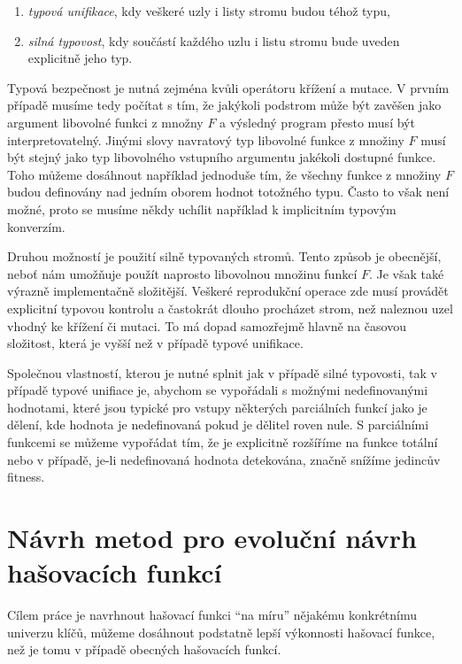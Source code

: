 \begin{enumerate}
	\item \textit{typová unifikace}, kdy veškeré uzly i listy stromu budou téhož typu,
	\item \textit{silná typovost}, kdy součástí každého uzlu i listu stromu bude uveden
	explicitně jeho typ.
\end{enumerate}

Typová bezpečnost je nutná zejména kvůli operátoru křížení a mutace. V prvním případě
musíme tedy počítat s tím, že jakýkoli podstrom může být zavěšen jako argument
libovolné funkci z množny $F$ a výsledný program přesto musí být interpretovatelný.
Jinými slovy navratový typ libovolné funkce z množiny $F$ musí být stejný jako
typ libovolného vstupního argumentu jakékoli dostupné funkce. Toho můžeme dosáhnout
například jednoduše tím, že všechny funkce z množiny $F$ budou definovány nad jedním
oborem hodnot totožného typu. Často to však není možné, proto se musíme někdy uchílit
například k implicitním typovým konverzím.

Druhou možností je použití silně typovaných stromů. Tento způsob je obecnější, neboť
nám umožňuje použít naprosto libovolnou množinu funkcí $F$. Je však také výrazně
implementačně složitější. Veškeré reprodukční operace zde musí provádět explicitní
typovou kontrolu a častokrát dlouho procházet strom, než naleznou uzel vhodný ke 
křížení či mutaci. To má dopad samozřejmě hlavně na časovou složitost, která je 
vyšší než v případě typové unifikace.

Společnou vlastností, kterou je nutné splnit jak v případě silné typovosti, tak v případě
typové unifiace je, abychom se vypořádali s možnými
nedefinovanými hodnotami, které jsou typické pro vstupy některých parciálních funkcí
jako je dělení, kde hodnota je nedefinovaná pokud je dělitel roven nule.
S parciálními funkcemi se můžeme vypořádat tím, že je explicitně rozšíříme na funkce
totální nebo v případě, je-li nedefinovaná hodnota detekována, značně snížíme jedincův 
fitness.

\chapter{Návrh metod pro evoluční návrh hašovacích funkcí}
\label{sec:solution_design}

Cílem práce je navrhnout hašovací funkci ``na
míru'' nějakému konkrétnímu univerzu klíčů, můžeme dosáhnout podstatně lepší 
výkonnosti hašovací funkce, než je tomu v případě obecných hašovacích funkcí.

